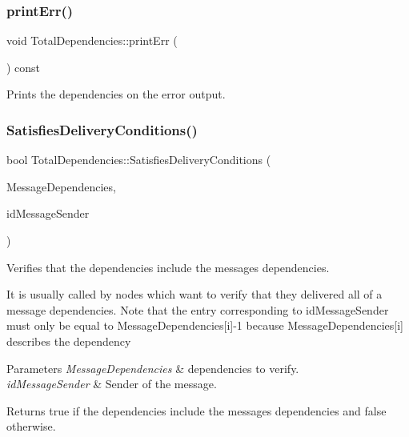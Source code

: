 \subsubsection{\texorpdfstring{print\+Err()}{printErr()}}
{\footnotesize\ttfamily void Total\+Dependencies\+::print\+Err (\begin{DoxyParamCaption}{ }\end{DoxyParamCaption}) const}



Prints the dependencies on the error output. 

\mbox{\label{class_total_dependencies_a6d050146cb0298091a4614610997d772}} 
\subsubsection{\texorpdfstring{Satisfies\+Delivery\+Conditions()}{SatisfiesDeliveryConditions()}}
{\footnotesize\ttfamily bool Total\+Dependencies\+::\+Satisfies\+Delivery\+Conditions (\begin{DoxyParamCaption}\item[{const \hyperlink{class_total_dependencies}{Total\+Dependencies} \&}]{Message\+Dependencies,  }\item[{unsigned int}]{id\+Message\+Sender }\end{DoxyParamCaption})}



Verifies that the dependencies include the message\textquotesingle{}s dependencies. 

It is usually called by nodes which want to verify that they delivered all of a message dependencies. Note that the entry corresponding to id\+Message\+Sender must only be equal to Message\+Dependencies\mbox{[}i\mbox{]}-\/1 because Message\+Dependencies\mbox{[}i\mbox{]} describes the dependency 
\begin{DoxyParams}{Parameters}
{\em Message\+Dependencies} & dependencies to verify. \\
\hline
{\em id\+Message\+Sender} & Sender of the message. \\
\hline
\end{DoxyParams}
\begin{DoxyReturn}{Returns}
true if the dependencies include the message\textquotesingle{}s dependencies and false otherwise. 
\end{DoxyReturn}
\mbox{\label{class_total_dependencies_a00ea27540cc51d5770d6013a21a41de2}} 
